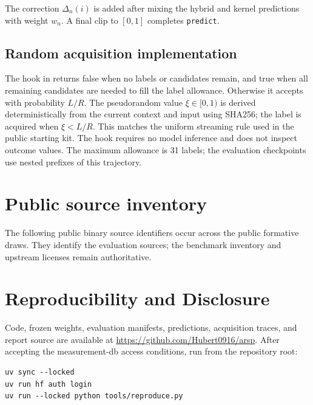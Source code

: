 \documentclass{article}
\begin{document}
The correction $\Delta_n(i)$ is added after mixing the hybrid and kernel predictions with weight $w_n$. A final clip to $[0,1]$ completes \texttt{predict}.

\subsection{Random acquisition implementation}\label{app:acquisition}

The hook in  returns false when no labels or candidates remain, and true when all remaining candidates are needed to fill the label allowance. Otherwise it accepts with probability $L/R$. The pseudorandom value $\xi\in[0,1)$ is derived deterministically from the current context and input using SHA256; the label is acquired when $\xi<L/R$. This matches the uniform streaming rule used in the public starting kit. The hook requires no model inference and does not inspect outcome values. The maximum allowance is 31 labels; the evaluation checkpoints use nested prefixes of this trajectory.

\section{Public source inventory}\label{app:sources}

The following \ProxySources{} public binary source identifiers occur across the \ProxyDraws{} public formative draws. They identify the evaluation sources; the benchmark inventory and upstream licenses remain authoritative.

\begingroup
\scriptsize

\endgroup

\section{Reproducibility and Disclosure}\label{app:reproducibility}

Code, frozen weights, evaluation manifests, predictions, acquisition traces, and report source are available at \url{https://github.com/Hubert0916/arsp}. After accepting the measurement-db access conditions, run from the repository root:

\begin{samepage}
\begin{verbatim}
uv sync --locked
uv run hf auth login
uv run --locked python tools/reproduce.py
\end{verbatim}
\end{samepage}
\end{document}
